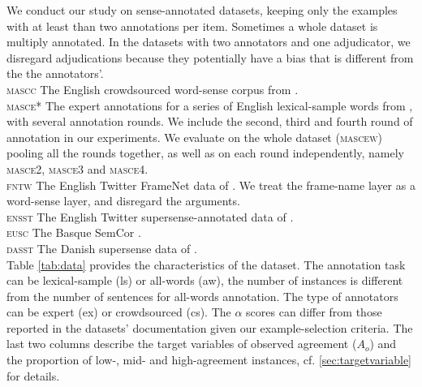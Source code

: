 \documentclass[11pt,a4paper]{article}
\begin{document}
We conduct our study on sense-annotated datasets, keeping only the examples with at least than two annotations per item. Sometimes a whole dataset is multiply annotated. In the datasets with two annotators and one adjudicator, we disregard adjudications because they potentially have a bias that is different from the the annotators'.\\
\noindent\textsc{mascc} The English crowdsourced word-sense corpus from .\\
\textsc{masce*} The expert annotations for a series of English lexical-sample words from , with several annotation rounds. We include the second, third and fourth round of annotation in our experiments. We evaluate on the whole dataset (\textsc{mascew}) pooling all the rounds together, as well as on each round independently, namely \textsc{masce2}, \textsc{masce3} and \textsc{masce4}.\\
\textsc{fntw} The English Twitter FrameNet data of . We treat the frame-name layer as a word-sense layer, and disregard the arguments.\\
\textsc{ensst} The English Twitter supersense-annotated data of .\\
\textsc{eusc} The Basque SemCor \cite{Agirre2006}.\\
\textsc{dasst} The Danish supersense data of \cite{MartinezAlonso2015}.\\
Table \ref{tab:data} provides the characteristics of the dataset. The annotation task can be lexical-sample (ls) or all-words (aw), the number of instances is different from the number of sentences for all-words annotation. The type of annotators can be expert (ex) or crowdsourced (cs). The $\alpha$ scores can differ from those reported in the datasets' documentation given our example-selection criteria. The last two columns describe the target variables of observed agreement ($A_o$) and the proportion of low-, mid- and high-agreement instances, cf. \ref{sec:targetvariable} for details.
\end{document}
